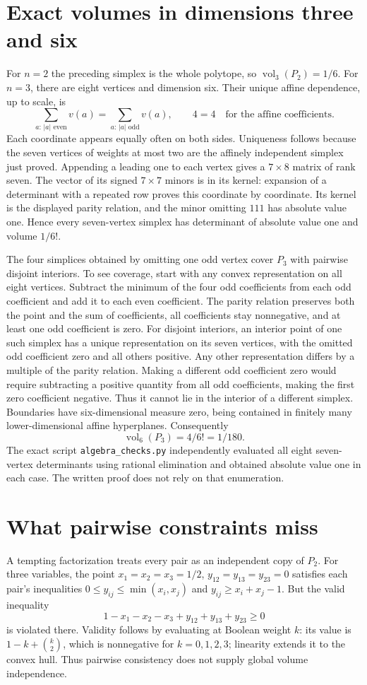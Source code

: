 \documentclass[11pt]{article}
\begin{document}
\section{Exact volumes in dimensions three and six}
For $n=2$ the preceding simplex is the whole polytope, so
$\operatorname{vol}_3(P_2)=1/6$.
For $n=3$, there are eight vertices and dimension six. Their unique affine
dependence, up to scale, is
\[
\sum_{a:\,|a|\text{ even}}v(a)=
\sum_{a:\,|a|\text{ odd}}v(a),\qquad 4=4
\quad\text{for the affine coefficients}.
\]
Each coordinate appears equally often on both sides. Uniqueness follows
because the seven vertices of weights at most two are the affinely independent
simplex just proved. Appending a leading one to each vertex gives a
$7\times8$ matrix of rank seven. The vector of its signed $7\times7$ minors
is in its kernel: expansion of a determinant with a repeated row proves
this coordinate by coordinate. Its kernel is the displayed parity relation,
and the minor omitting $111$ has absolute value one. Hence every
seven-vertex simplex has determinant of absolute value one and volume $1/6!$.

The four simplices obtained by omitting one odd vertex cover $P_3$ with
pairwise disjoint interiors. To see coverage, start with any convex
representation on all eight vertices. Subtract the minimum of the four odd
coefficients from each odd coefficient and add it to each even coefficient.
The parity relation preserves both the point and the sum of coefficients,
all coefficients stay nonnegative, and at least one odd coefficient is zero.
For disjoint interiors, an interior point of one such simplex has a unique
representation on its seven vertices, with the omitted odd coefficient zero
and all others positive. Any other representation differs by a multiple of
the parity relation. Making a different odd coefficient zero would require
subtracting a positive quantity from all odd coefficients, making the first
zero coefficient negative. Thus it cannot lie in the interior of a different
simplex. Boundaries have six-dimensional measure zero, being contained in
finitely many lower-dimensional affine hyperplanes. Consequently
\[
\operatorname{vol}_6(P_3)=4/6!=1/180.
\]
The exact script \texttt{algebra\_checks.py} independently evaluated all eight
seven-vertex determinants using rational elimination and obtained absolute
value one in each case. The written proof does not rely on that enumeration.

\section{What pairwise constraints miss}
A tempting factorization treats every pair as an independent copy of $P_2$.
For three variables, the point $x_1=x_2=x_3=1/2$, $y_{12}=y_{13}=y_{23}=0$
satisfies each pair's inequalities
$0\le y_{ij}\le\min(x_i,x_j)$ and $y_{ij}\ge x_i+x_j-1$.
But the valid inequality
\[
1-x_1-x_2-x_3+y_{12}+y_{13}+y_{23}\ge0
\]
is violated there. Validity follows by evaluating at Boolean weight $k$:
its value is $1-k+\binom k2$, which is nonnegative for $k=0,1,2,3$;
linearity extends it to the convex hull. Thus pairwise consistency does not
supply global volume independence.
\end{document}
